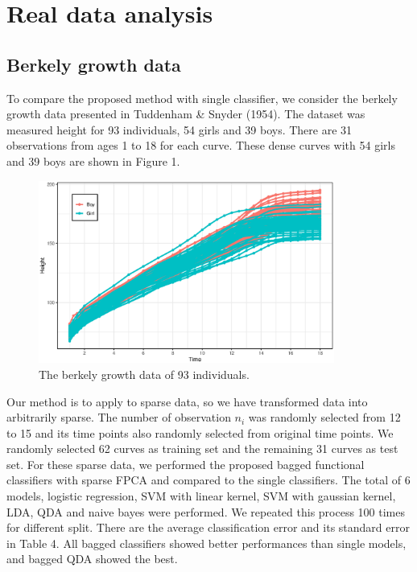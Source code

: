 \documentclass[eng]{csam}
\begin{document}
\section{Real data analysis}
\subsection{Berkely growth data}
To compare the proposed method with single classifier, we consider the berkely growth data presented in Tuddenham \& Snyder (1954). The dataset was measured height for 93 individuals, 54 girls and 39 boys. There are 31 observations from ages 1 to 18 for each curve. These dense curves with 54 girls and 39 boys are shown in Figure 1.

\begin{figure}[h]
	\centering
	\includegraphics[height=6cm,keepaspectratio=true]{img/growth.eps}
	\caption{The berkely growth data of 93 individuals.}
	\label{fig:rsxb}
\end{figure}

Our method is to apply to sparse data, so we have transformed data into arbitrarily sparse. The number of observation $n_i$ was randomly selected from 12 to 15 and its time points also randomly selected from original time points. We randomly selected 62 curves as training set and the remaining 31 curves as test set.
For these sparse data, we performed the proposed bagged functional classifiers with sparse FPCA and compared to the single classifiers. The total of 6 models, logistic regression, SVM with linear kernel, SVM with gaussian kernel, LDA, QDA and naive bayes were performed. We repeated this process 100 times for different split. There are the average classification error and its standard error in Table 4. All bagged classifiers showed better performances than single models, and bagged QDA showed the best. 
\end{document}
